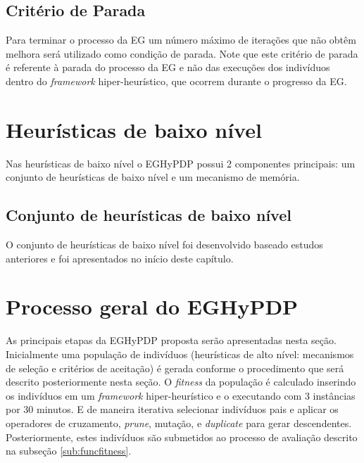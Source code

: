  
% 
%
 
 
 
   


  
  \subsection{Critério de Parada}
  \label{sub:criterioParada}
  
  Para terminar o processo da EG um número máximo de iterações que não obtêm melhora será utilizado como condição de parada. Note que este critério de parada é referente à parada do processo da EG e não das execuções dos indivíduos dentro do \textit{framework} hiper-heurístico, que ocorrem durante o progresso da EG. 
  
  
  \section{Heurísticas de baixo nível}
  
  Nas heurísticas de baixo nível o EGHyPDP possui 2 componentes principais: um conjunto de heurísticas de baixo nível e um mecanismo de memória.
  
  \subsection{Conjunto de heurísticas de baixo nível}
  O conjunto de heurísticas de baixo nível foi desenvolvido baseado estudos anteriores e foi apresentados no início deste capítulo.
  



\section{Processo geral do EGHyPDP} 

As principais etapas da EGHyPDP proposta serão apresentadas nesta seção.
Inicialmente uma população de indivíduos (heurísticas de alto nível: mecanismos de seleção e critérios de aceitação) é gerada conforme o procedimento que será descrito posteriormente nesta seção. O \textit{fitness} da população é calculado inserindo os indivíduos em um \textit{framework} hiper-heurístico e o executando com 3 instâncias por 30 minutos. E de maneira iterativa selecionar indivíduos pais e aplicar os operadores de cruzamento, \textit{prune}, mutação, e \textit{duplicate} para gerar descendentes. Posteriormente, estes indivíduos são submetidos ao processo de avaliação descrito na subseção \ref{sub:funcfitness}.

